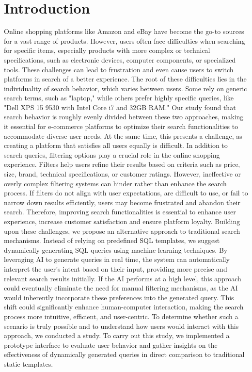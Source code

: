\documentclass[../../submission.tex]{subfiles}
\begin{document}
\section{Introduction}
Online shopping platforms like Amazon and eBay have become the go-to sources for a vast range of products. 
However, users often face difficulties when searching for specific items, especially products with more complex or technical specifications, 
such as electronic devices, computer components, or specialized tools. These challenges can lead to frustration and even cause users to switch platforms in 
search of a better experience. The root of these difficulties lies in the individuality of search behavior, which varies between users. Some rely on generic 
search terms, such as "laptop," while others prefer highly specific queries, like "Dell XPS 15 9530 with Intel Core i7 and 32GB RAM." Our study found that search 
behavior is roughly evenly divided between these two approaches, making it essential for e-commerce platforms to optimize their search functionalities to 
accommodate diverse user needs. At the same time, this presents a challenge, as creating a platform that satisfies all users equally is difficult.
In addition to search queries, filtering options play a crucial role in the online shopping experience. Filters help users refine their results based on 
criteria such as price, size, brand, technical specifications, or customer ratings. However, ineffective or overly complex filtering systems can hinder rather 
than enhance the search process. If filters do not align with user expectations, are difficult to use, or fail to narrow down results efficiently, users may 
become frustrated and abandon their search. Therefore, improving search functionalities is essential to enhance user experience, increase customer satisfaction
and ensure platform loyalty. Building upon these challenges, we propose an alternative approach to traditional search mechanisms. Instead of relying on predefined SQL templates, we suggest 
dynamically generating SQL queries using machine learning techniques. By leveraging AI to generate queries in real time, the system can automatically interpret 
the user’s intent based on their input, providing more precise and relevant search results initially. If the AI performs at a high level, this approach could 
eventually eliminate the need for manual filtering mechanisms, as the AI would inherently incorporate these preferences into the generated query. 
This shift could significantly enhance human-computer interaction, making the search process more intuitive, efficient, and user-centric.
To determine whether such a scenario is truly possible and to understand how users would interact with this approach, we conducted a study. 
To carry out this study, we implemented a prototype interface to evaluate user behavior and gather insights on the effectiveness of dynamically generated 
queries in direct comparison to traditional static templates.
\end{document}
